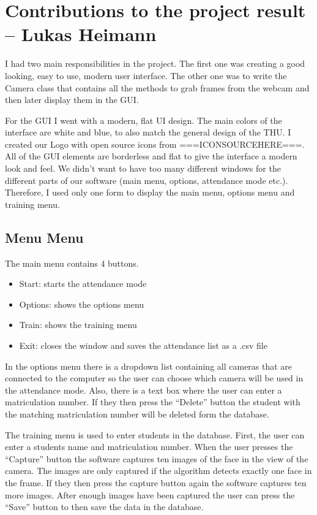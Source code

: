 \documentclass[12pt, a4paper]{article}
\begin{document}
\newpage


\section{Contributions to the project result – Lukas Heimann}
I had two main responsibilities in the project. The first one was creating a good looking, easy to use, modern user interface. The other one was to write the Camera class that contains all the methods to grab frames from the webcam and then later display them in the GUI.

For the GUI I went with a modern, flat UI design. The main colors of the interface are white and blue, to also match the general design of the THU. I created our Logo with open source icons from ===ICONSOURCEHERE===. All of the GUI elements are borderless and flat to give the interface a modern look and feel. We didn’t want to have too many different windows for the different parts of our software (main menu, options, attendance mode etc.). Therefore, I used only one form to display the main menu, options menu and training menu.

\subsection{Menu Menu}
The main menu contains 4 buttons.
\begin{itemize}
\item Start: starts the attendance mode
\item Options: shows the options menu
\item Train: shows the training menu
\item Exit: closes the window and saves the attendance list as a .csv file
\end{itemize}

In the options menu there is a dropdown list containing all cameras that are connected to the computer so the user can choose which camera will be used in the attendance mode. Also, there is a text box where the user can enter a matriculation number. If they then press the “Delete” button the student with the matching matriculation number will be deleted form the database. 

The training menu is used to enter students in the database. First, the user can enter a students name and matriculation number.  When the user presses the “Capture” button the software captures ten images of the face in the view of the camera. The images are only captured if the algorithm detects exactly one face in the frame. If they then press the capture button again the software captures ten more images. After enough images have been captured the user can press the “Save” button to then save the data in the database. 
\end{document}
